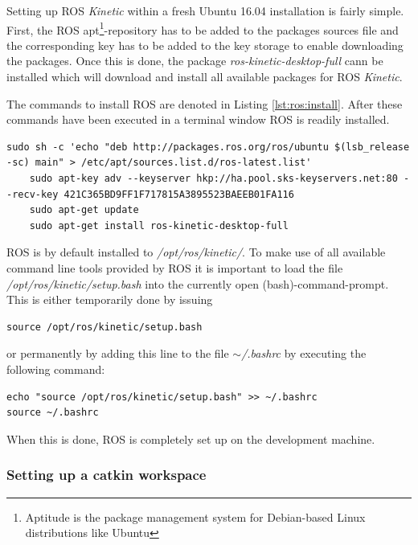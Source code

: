 Setting up ROS \textit{Kinetic} within a fresh Ubuntu 16.04 installation is fairly simple. First, the ROS apt\footnote{Aptitude is the package management system for Debian-based Linux distributions like Ubuntu}-repository has to be added to the packages sources file and the corresponding key has to be added to the key storage to enable downloading the packages. Once this is done, the package \textit{ros-kinetic-desktop-full} cann be installed which will download and install all available packages for ROS \textit{Kinetic}.

The commands to install ROS are denoted in Listing \ref{lst:ros:install}. After these commands have been executed in a terminal window ROS is readily installed.

\begin{minipage}{\linewidth}
	\begin{lstlisting}[caption={Commands for installing ROS\cite{ros:install}},label={lst:ros:install}]
	sudo sh -c 'echo "deb http://packages.ros.org/ros/ubuntu $(lsb_release -sc) main" > /etc/apt/sources.list.d/ros-latest.list'
	sudo apt-key adv --keyserver hkp://ha.pool.sks-keyservers.net:80 --recv-key 421C365BD9FF1F717815A3895523BAEEB01FA116
	sudo apt-get update
	sudo apt-get install ros-kinetic-desktop-full
	\end{lstlisting}
\end{minipage}

ROS is by default installed to \textit{/opt/ros/kinetic/}. To make use of all available command line tools provided by ROS it is important to load the file \textit{/opt/ros/kinetic/setup.bash} into the currently open (bash)-command-prompt. This is either temporarily done by issuing

\begin{lstlisting}[caption={Temporarily loading the ROS environment into bash}]
source /opt/ros/kinetic/setup.bash
\end{lstlisting}

or permanently by adding this line to the file \textit{$\sim$/.bashrc} by executing the following command:

\begin{lstlisting}[caption={Permamently installing the ROS environment into bash}]
echo "source /opt/ros/kinetic/setup.bash" >> ~/.bashrc
source ~/.bashrc
\end{lstlisting}

When this is done, ROS is completely set up on the development machine.

\subsubsection[Setting up catkin]{Setting up a catkin workspace\cite{ros:install:catkin}} 

